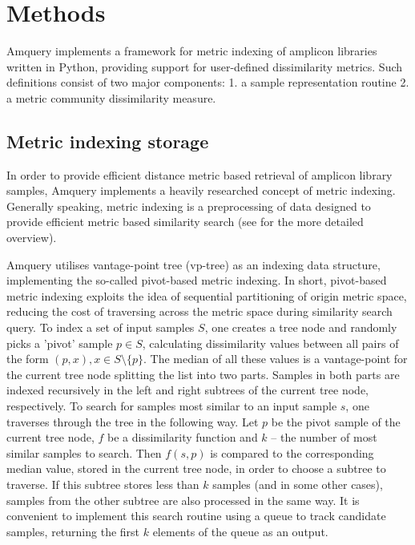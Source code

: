 \documentclass[10pt,letterpaper]{article}
\begin{document}
\section*{Methods}
Amquery implements a framework for metric indexing of amplicon libraries written in Python, 
providing support for user-defined dissimilarity metrics. Such definitions consist of two major components:
1. a sample representation routine
2. a metric community dissimilarity measure.

\subsection*{Metric indexing storage}
In order to provide efficient distance metric based retrieval of amplicon library samples, Amquery implements a heavily researched concept of metric indexing. 
Generally speaking, metric indexing is a preprocessing of data designed to provide efficient metric based similarity search (see \cite{hetland2009basic} for the more detailed overview).

Amquery utilises vantage-point tree (vp-tree) \cite{yianilos1993data, chavez2001searching} as an indexing data structure, implementing the so-called pivot-based metric indexing.
In short, pivot-based metric indexing exploits the idea of sequential partitioning of origin metric space, reducing the cost of traversing across the metric space during similarity search query. To index a set of input samples $S$, one creates a tree node and randomly picks a 'pivot' sample $p \in S$, calculating dissimilarity values between all pairs of the form $(p, x), x \in S \setminus \{ p \}$.
The median of all these values is a vantage-point for the current tree node splitting the list into two parts. Samples in both parts are indexed recursively in the left and right subtrees of the current tree node, respectively.
To search for samples most similar to an input sample $s$, one traverses through the tree in the following way. Let $p$ be the pivot sample of the current tree node, $f$ be a dissimilarity function and $k$ -- the number of most similar samples to search.
Then $f(s, p)$ is compared to the corresponding median value, stored in the current tree node, in order to choose a subtree to traverse. If this subtree stores less than $k$ samples (and in some other cases), samples from the other subtree are also processed in the same way. It is convenient to implement this search routine using a queue to track candidate samples, returning the first $k$ elements of the queue as an output.
\end{document}
